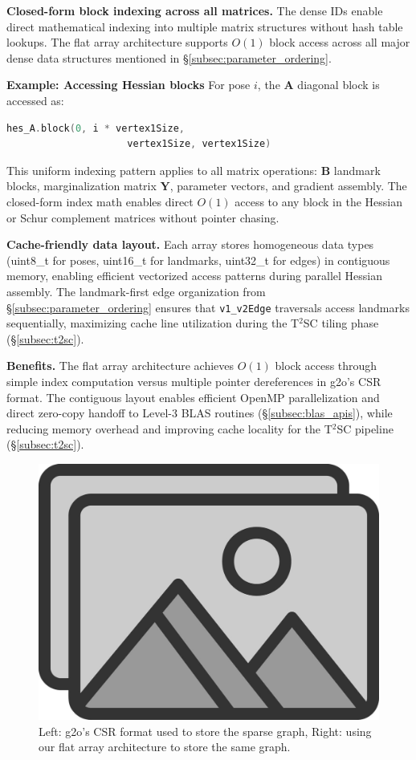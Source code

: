 \textbf{Closed-form block indexing across all matrices.} The dense IDs enable direct mathematical indexing 
into multiple matrix structures without hash table lookups. The flat array architecture supports $O(1)$ 
block access across all major dense data structures mentioned in \S\ref{subsec:parameter_ordering}.


\hspace{-1.5em}
\textbf{Example: Accessing Hessian blocks} \newline
    For pose $i$, the $\mathbf{A}$ diagonal block is accessed as:
\begin{lstlisting}[language=C++, basicstyle=\ttfamily\small]
hes_A.block(0, i * vertex1Size, 
                     vertex1Size, vertex1Size)
\end{lstlisting}

This uniform indexing pattern applies to all matrix operations: $\mathbf{B}$ landmark blocks, 
marginalization matrix $\mathbf{Y}$, parameter vectors, and gradient assembly. The closed-form index 
math enables direct $O(1)$ access to any block in the Hessian or Schur complement matrices without 
pointer chasing.

\textbf{Cache-friendly data layout.} Each array stores homogeneous data types (uint8\_t for poses, uint16\_t 
for landmarks, uint32\_t for edges) in contiguous memory, enabling efficient vectorized access patterns during 
parallel Hessian assembly. The landmark-first edge organization from \S\ref{subsec:parameter_ordering} ensures 
that \texttt{v1\_v2Edge} traversals access landmarks sequentially, maximizing cache line utilization during 
the T$^2$SC tiling phase (\S\ref{subsec:t2sc}).

\textbf{Benefits.} The flat array architecture achieves $O(1)$ block access through simple index 
computation versus multiple pointer dereferences in g2o's CSR format. The contiguous layout enables 
efficient OpenMP parallelization and direct zero-copy handoff to Level-3 BLAS routines (\S\ref{subsec:blas_apis}), 
while reducing memory overhead and improving cache locality for the T$^2$SC pipeline (\S\ref{subsec:t2sc}).

\begin{figure}[t]
  \centering
  \includegraphics[width=0.85\linewidth]{figs/placeholder}
  \caption{Left: g2o's CSR format used to store the sparse graph, Right: using our flat array architecture to
  store the same graph.}
  \label{fig:connectivity_storage}
\end{figure}

